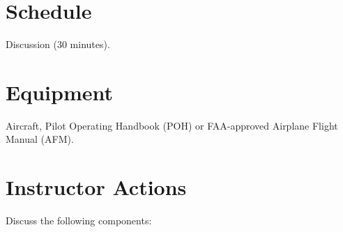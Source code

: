 \documentclass[twoside,openright]{report}
\begin{document}
\section{Schedule}

Discussion (30 minutes).

\section{Equipment}

Aircraft, Pilot Operating Handbook (POH) or FAA-approved Airplane Flight Manual (AFM).

\section{Instructor Actions}

Discuss the following components:
\end{document}
